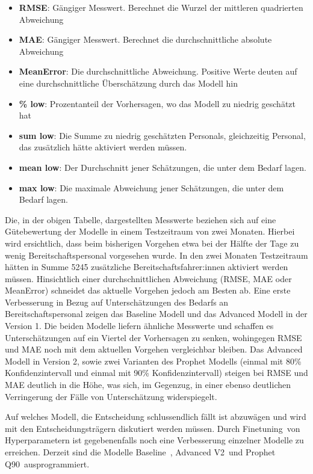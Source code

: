 \begin{itemize}
 \itemsep-8pt
 \item \textbf{RMSE}: Gängiger Messwert. Berechnet die Wurzel der mittleren quadrierten Abweichung
 \item \textbf{MAE}: Gängiger Messwert. Berechnet die durchschnittliche absolute Abweichung
 \item \textbf{MeanError}: Die durchschnittliche Abweichung. Positive Werte deuten auf eine durchschnittliche Überschätzung durch das Modell hin
 \item \textbf{\% low}: Prozentanteil der Vorhersagen, wo das Modell zu niedrig geschätzt hat
 \item \textbf{sum low}: Die Summe zu niedrig geschätzten Personals, gleichzeitig Personal, das zusätzlich hätte aktiviert werden müssen.
 \item \textbf{mean low}: Der Durchschnitt jener Schätzungen, die unter dem Bedarf lagen. 
 \item \textbf{max low}: Die maximale Abweichung jener Schätzungen, die unter dem Bedarf lagen.
 \end{itemize}


Die, in der obigen Tabelle, dargestellten Messwerte beziehen sich auf eine Gütebewertung der Modelle in einem Testzeitraum von zwei Monaten. Hierbei wird ersichtlich, dass beim bisherigen Vorgehen etwa bei der Hälfte der Tage zu wenig Bereitschaftspersonal vorgesehen wurde. In den zwei Monaten Testzeitraum hätten in Summe 5245 zusätzliche Bereitschaftsfahrer:innen aktiviert werden müssen. Hinsichtlich einer durchschnittlichen Abweichung (RMSE, MAE oder MeanError) schneidet das aktuelle Vorgehen jedoch am Besten ab. Eine erste Verbesserung in Bezug auf Unterschätzungen des Bedarfs an Bereitschaftspersonal zeigen das Baseline Modell und das Advanced Modell in der Version 1. Die beiden Modelle liefern ähnliche Messwerte und schaffen es Unterschätzungen auf ein Viertel der Vorhersagen zu senken, wohingegen RMSE und MAE noch mit dem aktuellen Vorgehen vergleichbar bleiben. Das Advanced Modell in Version 2, sowie zwei Varianten des Prophet Modells (einmal mit 80\% Konfidenzintervall und einmal mit 90\% Konfidenzintervall) steigen bei RMSE und MAE deutlich in die Höhe, was sich, im Gegenzug, in einer ebenso deutlichen Verringerung der Fälle von Unterschätzung widerspiegelt. 

Auf welches Modell, die Entscheidung schlussendlich fällt ist abzuwägen und wird mit den Entscheidungsträgern diskutiert werden müssen. Durch \glqq Finetuning\grqq\ von Hyperparametern ist gegebenenfalls noch eine Verbesserung einzelner Modelle zu erreichen. Derzeit sind die Modelle \glqq Baseline\grqq\ , \glqq Advanced V2\grqq\ und \glqq Prophet Q90\grqq\ ausprogrammiert.

